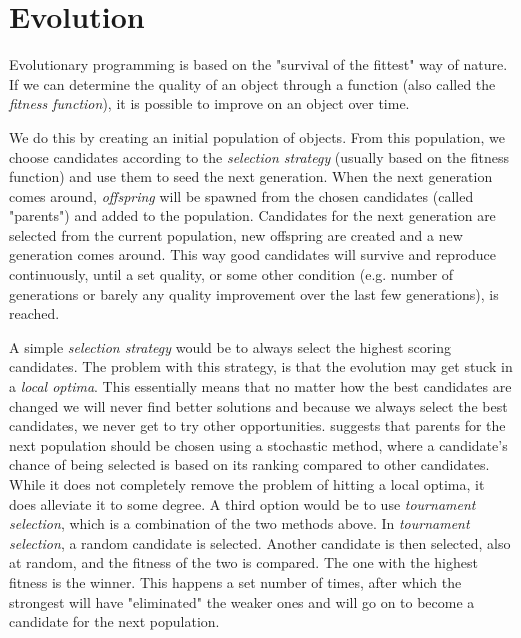 \section{Evolution}
\label{methodology_evolution}

Evolutionary programming\cite{eiben2008introduction, eiben2002evolutionary} is based on the "survival of the fittest" way of nature. If we can determine the quality of an object through a function (also called the \textit{fitness function}), it is possible to improve on an object over time.

We do this by creating an initial population of objects. From this population, we choose candidates according to the \textit{selection strategy} (usually based on the fitness function) and use them to seed the next generation. When the next generation comes around, \textit{offspring} will be spawned from the chosen candidates (called "parents") and added to the population. Candidates for the next generation are selected from the current population, new offspring are created and a new generation comes around. This way good candidates will survive and reproduce continuously, until a set quality, or some other condition (e.g. number of generations or barely any quality improvement over the last few generations), is reached.

A simple \textit{selection strategy} would be to always select the highest scoring candidates. The problem with this strategy, is that the evolution may get stuck in a \textit{local optima}. This essentially means that no matter how the best candidates are changed we will never find better solutions and because we always select the best candidates, we never get to try other opportunities. \citeauthor{rocha1999preventing}\cite{rocha1999preventing} suggests that parents for the next population should be chosen using a stochastic method, where a candidate's chance of being selected is based on its ranking compared to other candidates. While it does not completely remove the problem of hitting a local optima, it does alleviate it to some degree. A third option would be to use \textit{tournament selection}, which is a combination of the two methods above. In \textit{tournament selection}, a random candidate is selected. Another candidate is then selected, also at random, and the fitness of the two is compared. The one with the highest fitness is the winner. This happens a set number of times, after which the strongest will have "eliminated" the weaker ones and will go on to become a candidate for the next population.


